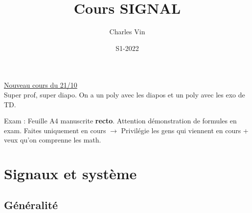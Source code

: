 \documentclass{article}
\title{Cours SIGNAL}
\author{Charles Vin}
\date{S1-2022}
\theoremstyle{plain}%
\theoremstyle{definition}
\theoremstyle{remark}
\begin{document}
\maketitle

\underline{Nouveau cours du 21/10} \\

Super prof, super diapo. On a un poly avec les diapos et un poly avec les exo de TD.

Exam : Feuille A4 manuscrite \textbf{recto}. Attention démonstration de formules en exam. Faites uniquement en cours $\rightarrow$ Privilégie les gens qui viennent en cours + veux qu'on comprenne les math.

\section{Signaux et système}
\subsection{Généralité}
\end{document}

